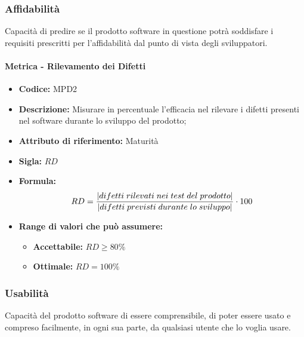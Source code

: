 \subsubsection{Affidabilità} 
Capacità di predire se il prodotto software in questione potrà soddisfare i requisiti prescritti per l'affidabilità dal punto di vista degli sviluppatori.

\paragraph{Metrica - Rilevamento dei Difetti} 
\begin{itemize}
    \item \textbf{Codice:} MPD2
    \item \textbf{Descrizione:} Misurare in percentuale l'efficacia nel rilevare i difetti presenti nel software durante lo sviluppo del prodotto;
    \item \textbf{Attributo di riferimento:} Maturità
    \item \textbf{Sigla:} $RD$
    \item \textbf{Formula:} $$RD = {|difetti \; rilevati \; nei \; test \; del \; prodotto| \over |difetti \; previsti \; durante \; lo \; sviluppo|} \cdot 100 $$
    \item \textbf{Range di valori che può assumere:}
    \begin{itemize}
        \item \textbf{Accettabile:} $RD \geq 80\% $
        \item \textbf{Ottimale:} $RD = 100\%$
    \end{itemize}
\end{itemize}

\subsubsection{Usabilità} 
Capacità del prodotto software di essere comprensibile, di poter essere usato e compreso facilmente, in ogni sua parte, da qualsiasi utente che lo voglia usare.\\
